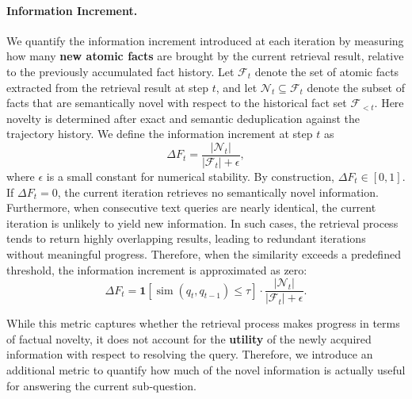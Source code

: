 \paragraph{Information Increment.}
We quantify the information increment introduced at each iteration by measuring how many \textbf{new atomic facts} are brought by the current retrieval result, relative to the previously accumulated fact history. Let $\mathcal{F}_t$ denote the set of atomic facts extracted from the retrieval result at step $t$, and let $\mathcal{N}_t \subseteq \mathcal{F}_t$ denote the subset of facts that are semantically novel with respect to the historical fact set $\mathcal{F}_{<t}$. Here novelty is determined after exact and semantic deduplication against the trajectory history. We define the information increment at step $t$ as
\begin{equation}
    \Delta F_t = \dfrac{\left| \mathcal{N}_t \right|}{\left| \mathcal{F}_t \right| + \epsilon},
\end{equation}
where $\epsilon$ is a small constant for numerical stability. By construction, $\Delta F_t \in [0,1]$. If $\Delta F_t = 0$, the current iteration retrieves no semantically novel information. Furthermore, when consecutive text queries are nearly identical, the current iteration is unlikely to yield new information. In such cases, the retrieval process tends to return highly overlapping results, leading to redundant iterations without meaningful progress. Therefore, when the similarity exceeds a predefined threshold, the information increment is approximated as zero:
\begin{equation}
\Delta F_t
=
\mathbf{1}\!\left[\operatorname{sim}(q_t, q_{t-1}) \le \tau\right]
\cdot
\dfrac{\left| \mathcal{N}_t \right|}{\left| \mathcal{F}_t \right| + \epsilon}.
\end{equation}

While this metric captures whether the retrieval process makes progress in terms of factual novelty, it does not account for the \textbf{utility} of the newly acquired information with respect to resolving the query. Therefore, we introduce an additional metric to quantify how much of the novel information is actually useful for answering the current sub-question.

